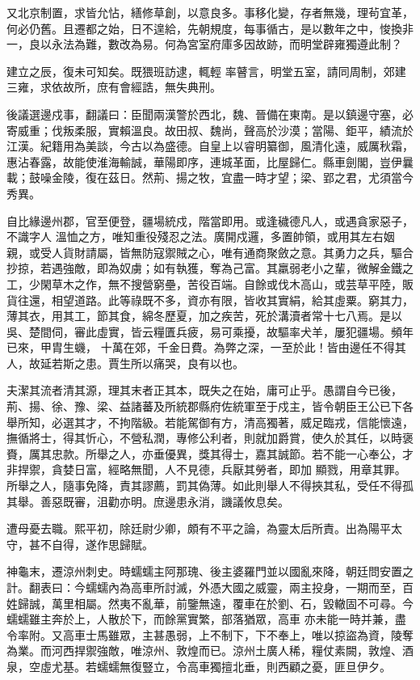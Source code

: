 \begin{pinyinscope}
 又北京制置，求皆允怗，繕修草創，以意良多。事移化變，存者無幾，理茍宜革，何必仍舊。且遷都之始，日不遑給，先朝規度，每事循古，是以數年之中，悛換非一，良以永法為難，數改為易。何為宮室府庫多因故跡，而明堂辟雍獨遵此制？



 建立之辰，復未可知矣。既猥班訪逮，輒輕
 率瞽言，明堂五室，請同周制，郊建三雍，求依故所，庶有會經誥，無失典刑。



 後議選邊戍事，翻議曰：臣聞兩漢警於西北，魏、晉備在東南。是以鎮邊守塞，必寄威重；伐叛柔服，實賴溫良。故田叔、魏尚，聲高於沙漠；當陽、鉅平，績流於江漢。紀籍用為美談，今古以為盛德。自皇上以睿明纂御，風清化遠，威厲秋霜，惠沾春露，故能使淮海輸誠，華陽即序，連城革面，比屋歸仁。縣車劍閣，豈伊曩載；鼓噪金陵，復在茲日。然荊、揚之牧，宜盡一時才望；梁、郢之君，尤須當今秀異。



 自比緣邊州郡，官至便登，疆場統戍，階當即用。或逢穢德凡人，或遇貪家惡子，不識字人
 溫恤之方，唯知重役殘忍之法。廣開戍邏，多置帥領，或用其左右姻親，或受人貨財請屬，皆無防寇禦賊之心，唯有通商聚斂之意。其勇力之兵，驅合抄掠，若遇強敵，即為奴虜；如有執獲，奪為己富。其羸弱老小之輩，微解金鐵之工，少閑草木之作，無不搜營窮壘，苦役百端。自餘或伐木高山，或芸草平陸，販貨往還，相望道路。此等祿既不多，資亦有限，皆收其實絹，給其虛粟。窮其力，薄其衣，用其工，節其食，綿冬歷夏，加之疾苦，死於溝瀆者常十七八焉。是以吳、楚間伺，審此虛實，皆云糧匱兵疲，易可乘擾，故驅率犬羊，屢犯疆場。頻年已來，甲胄生蟣，
 十萬在郊，千金日費。為弊之深，一至於此！皆由邊任不得其人，故延若斯之患。賈生所以痛哭，良有以也。



 夫潔其流者清其源，理其末者正其本，既失之在始，庸可止乎。愚謂自今已後，荊、揚、徐、豫、梁、益諸蕃及所統郡縣府佐統軍至于戍主，皆令朝臣王公已下各舉所知，必選其才，不拘階級。若能駕御有方，清高獨著，威足臨戎，信能懷遠，撫循將士，得其忻心，不營私潤，專修公利者，則就加爵賞，使久於其任，以時褒賚，厲其忠款。所舉之人，亦垂優異，獎其得士，嘉其誠節。若不能一心奉公，才非捍禦，貪婪日富，經略無聞，人不見德，兵厭其勞者，即加
 顯戮，用章其罪。所舉之人，隨事免降，責其謬薦，罰其偽薄。如此則舉人不得挾其私，受任不得孤其舉。善惡既審，沮勸亦明。庶邊患永消，譏議攸息矣。



 遭母憂去職。熙平初，除廷尉少卿，頗有不平之論，為靈太后所責。出為陽平太守，甚不自得，遂作思歸賦。



 神龜末，遷涼州刺史。時蠕蠕主阿那瑰、後主婆羅門並以國亂來降，朝廷問安置之計。翻表曰：今蠕蠕內為高車所討滅，外憑大國之威靈，兩主投身，一期而至，百姓歸誠，萬里相屬。然夷不亂華，前鑒無遠，覆車在於劉、石，毀轍固不可尋。今蠕蠕雖主奔於上，人散於下，而餘黨實繁，部落猶眾，高車
 亦未能一時并兼，盡令率附。又高車士馬雖眾，主甚愚弱，上不制下，下不奉上，唯以掠盜為資，陵奪為業。而河西捍禦強敵，唯涼州、敦煌而已。涼州土廣人稀，糧仗素闕，敦煌、酒泉，空虛尤基。若蠕蠕無復豎立，令高車獨擅北垂，則西顧之憂，匪旦伊夕。




\end{pinyinscope}
